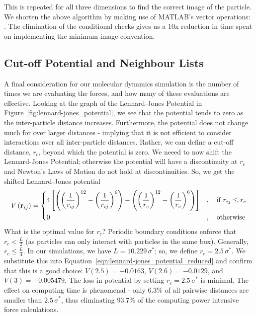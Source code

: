 \documentclass[../Main.tex]{subfiles}
\begin{document}
This is repeated for all three dimensions to find the correct image of the particle.
We shorten the above algorithm by making use of MATLAB's vector operations: . The elimination of the conditional checks gives us a 10x reduction in time spent on implementing the minimum image convention.

\subsection{Cut-off Potential and Neighbour Lists}

A final consideration for our molecular dynamics simulation is the number of times we are evaluating the forces, and how many of these evaluations are effective. Looking at the graph of the Lennard-Jones Potential in Figure~\ref{fig:lennard-jones_potential}, we see that the potential tends to zero as the inter-particle distance increases. Furthermore, the potential does not change much for over larger distances - implying that it is not efficient to consider interactions over all inter-particle distances. Rather, we can define a cut-off distance, $r_{c}$, beyond which the potential is zero. We neeed to now shift the Lennard-Jones Potential; otherwise the potential will have a discontinuity at $r_{c}$ and Newton's Laws of Motion do not hold at discontinuities. So, we get the shifted Lennard-Jones potential
\begin{align}
	V\left(\vec{r}_{ij}\right) = \begin{dcases}
			4 \left[ \left(\left( \frac{1}{r_{ij}}\right)^{12} - \left( \frac{1}{r_{ij}}\right)^{6}\right) - \Bigg(\bigg( \frac{1}{r_{c}}\bigg)^{12} - \bigg( \frac{1}{r_{c}}\bigg)^{6}\Bigg) \right]&,\quad  \mbox{if } r_{ij} \leq r_{c} \\
			0&,\quad \mbox{otherwise} 
	\end{dcases} \label{eqn:lennard-jones_potential_reduced_shifted}
\end{align}
What is the optimal value for $r_{c}$? Periodic boundary conditions enforce that $r_{c} < \frac{L}{2}$ (as particles can only interact with particles in the same box). Generally, $r_{c} \leq \frac{L}{4}$\cite{FrenkelSmit2001}. In our simulations, we have $L = 10.229\,\sigma^{*}$; so, we define $r_{c} = 2.5\,\sigma^{*}$. We substitute this into Equation~\ref{eqn:lennard-jones_potential_reduced} and confirm that this is a good choice: $V(2.5) = -0.0163$, $V(2.6) = -0.0129$, and $V(3) = -0.005479$. The  loss in potential by setting $r_{c} = 2.5\,\sigma^{*}$ is minimal. The effect on computing time is phenomenal - only $6.3\%$ of all pairwise distances are smaller than $2.5\,\sigma^{*}$, thus eliminating $93.7\%$ of the computing power intensive force calculations.
\end{document}
